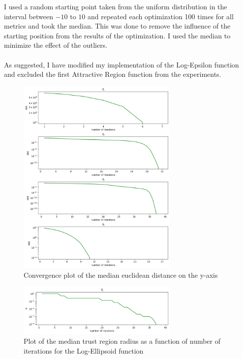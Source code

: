 \documentclass[a4paper]{article}
\begin{document}
I used a random starting point taken from the uniform distribution in the
interval between $-10$ to $10$ and repeated each optimization 100 times for all
metrics and took the median. This was done to remove the influence of the
starting position from the results of the optimization. I used the median
to minimize the effect of the outliers. \\\\
As suggested, I have modified my implementation of the Log-Epsilon function and
excluded the first Attractive Region function from the experiments.

\begin{figure}[H]
    \centering
    \includegraphics[width=0.7\textwidth]{plt_dist1000.png}
    \caption{Convergence plot of the median euclidean distance on the y-axis}
  \label{plt1}
\end{figure}

\begin{figure}[H]
    \centering
    \includegraphics[width=0.7\textwidth]{plt_radius1000.png}
    \caption{Plot of the median trust region radius as a function of number of
      iterations for the Log-Ellipsoid function}
    \label{plt3}
\end{figure}
\end{document}
